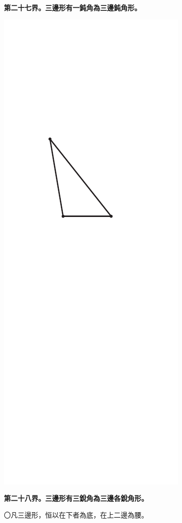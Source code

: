 \documentclass[12pt,b5paper,landscape]{article}
\newcommand{\bcom}[1]{〇#1}
\newcommand{\cthm}[1]{{
\vspace{8pt}

\bfseries #1}}
\begin{document}
\begin{multicols}{2}
\cthm{第二十七界。三邊形有一鈍角為三邊鈍角形。}
\begin{center}
\includegraphics[angle=90]{eu18}
\end{center}

\cthm{第二十八界。三邊形有三銳角為三邊各銳角形。}\bcom{凡三邊形，恒以在下者為底，在上二邊為腰。}


\end{multicols}
\end{document}
